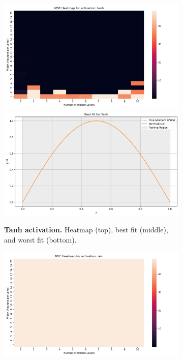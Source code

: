 \begin{figure}[h]
    \centering
    \hspace*{\fill}
    \begin{subfigure}[t]{0.48\textwidth}
        \centering
        \includegraphics[width=\textwidth]{graphics/mse_heatmap_bvp_poisson_tanh.png}
        \includegraphics[width=\textwidth]{graphics/bvp_poisson_best_fit_tanh_9layers_18width.png}
        \caption{\textbf{Tanh activation.} Heatmap (top), best fit (middle), and worst fit (bottom).}
        \label{fig:ivp_periodic_tanh}
    \end{subfigure}
    \hspace*{\fill}
    \begin{subfigure}[t]{0.48\textwidth}
        \centering
        \includegraphics[width=\textwidth]{graphics/mse_heatmap_bvp_poisson_relu.png}

\end{subfigure}
\end{figure}

